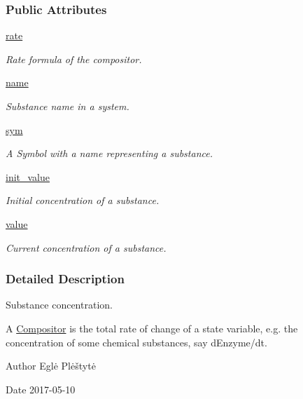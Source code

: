 \subsubsection*{Public Attributes}
\begin{DoxyCompactItemize}
\item 
\hyperlink{classCompositor_1_1Compositor_acfb506bc53105422233aad45a7eaa6fe}{rate}
\begin{DoxyCompactList}\small\item\em Rate formula of the compositor. \end{DoxyCompactList}\item 
\hyperlink{classCompositor_1_1Compositor_a87d9f58151be1502f8a10ffb4cdb8515}{name}
\begin{DoxyCompactList}\small\item\em Substance name in a system. \end{DoxyCompactList}\item 
\hyperlink{classCompositor_1_1Compositor_aa46010406a3b768a7b6a864166e71947}{sym}
\begin{DoxyCompactList}\small\item\em A Symbol with a {\ttfamily name} representing a substance. \end{DoxyCompactList}\item 
\hyperlink{classCompositor_1_1Compositor_a2f4d70bb0294f38fb00dfa4a43a9accf}{init\+\_\+value}
\begin{DoxyCompactList}\small\item\em Initial concentration of a substance. \end{DoxyCompactList}\item 
\hyperlink{classCompositor_1_1Compositor_a897d2fe21edf2aa868e7a47c8db7a007}{value}
\begin{DoxyCompactList}\small\item\em Current concentration of a substance. \end{DoxyCompactList}\end{DoxyCompactItemize}


\subsubsection{Detailed Description}
Substance concentration. 

A \hyperlink{classCompositor_1_1Compositor}{Compositor} is the total rate of change of a state variable, e.\+g. the concentration of some chemical substances, say d\+Enzyme/dt.

\begin{DoxyAuthor}{Author}
Eglė Plėštytė 
\end{DoxyAuthor}
\begin{DoxyDate}{Date}
2017-\/05-\/10 
\end{DoxyDate}


